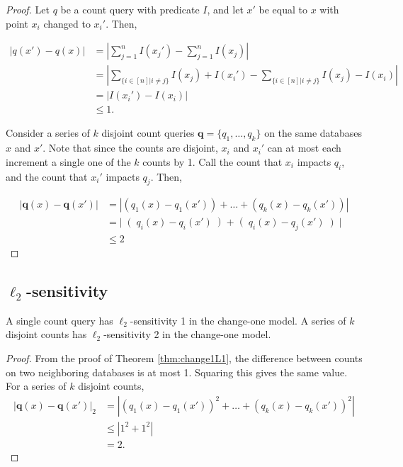 \documentclass[11pt]{scrartcl} %
\begin{document}
\begin{proof}
Let $q$ be a count query with predicate $I$, and let $x'$ be equal to $x$ with point $x_i$ changed to $x_i'$. Then,

\begin{align*}
\left\vert q(x') - q(x) \right\vert &= \left\vert \sum_{j=1}^n I(x_j') - \sum_{j=1}^n I(x_j) \right\vert \\
	&= \left\vert \sum_{\{ i \in [n] \vert i \ne j\}} I(x_j) + I(x_i') - \sum_{\{ i \in [n] \vert i \ne j\}} I(x_j) - I(x_i) \right\vert \\
	&= \left\vert I(x_i') - I(x_i) \right\vert \\
	& \le 1.
\end{align*}

Consider a series of $k$ disjoint count queries $\mathbf{q} = \{q_1, \ldots, q_k\}$ on the same databases $x$ and $x'$. Note that since the counts are disjoint, $x_i$ and $x_i'$ can at most each increment a single one of the $k$ counts by 1. Call the count that $x_i$ impacts $q_i$, and the count that $x_i'$ impacts $q_j$. Then,

\begin{align*}
\left\vert \mathbf{q}(x) - \mathbf{q}(x') \right\vert &= \left\vert \left(q_1(x) - q_1(x')\right) + \ldots + \left(q_k(x) - q_k(x')\right) \right\vert \\
	&= \left\vert \right(q_i(x) - q_i(x')\left) + \right(q_i(x) - q_j(x')\left) \right\vert \\
	&\le 2
\end{align*}
\end{proof}

\subsection{$\ell_2$-sensitivity}

\begin{theorem}
A single count query has $\ell_2$-sensitivity 1 in the change-one model. A series of $k$ disjoint counts has $\ell_2$-sensitivity 2 in the change-one model.
\end{theorem}

\begin{proof}
From the proof of Theorem \ref{thm:change1L1}, the difference between counts on two neighboring databases is at most 1. Squaring this gives the same value. For a series of $k$ disjoint counts,
\begin{align*}
\left\vert \mathbf{q}(x) - \mathbf{q}(x') \right\vert_2 &= \left\vert \left(q_1(x) - q_1(x')\right)^2 + \ldots + \left(q_k(x) - q_k(x')\right)^2 \right\vert \\
 & \le \left\vert 1^2 + 1^2 \right\vert \\
 &= 2.
 \end{align*}
\end{proof}
\end{document}

